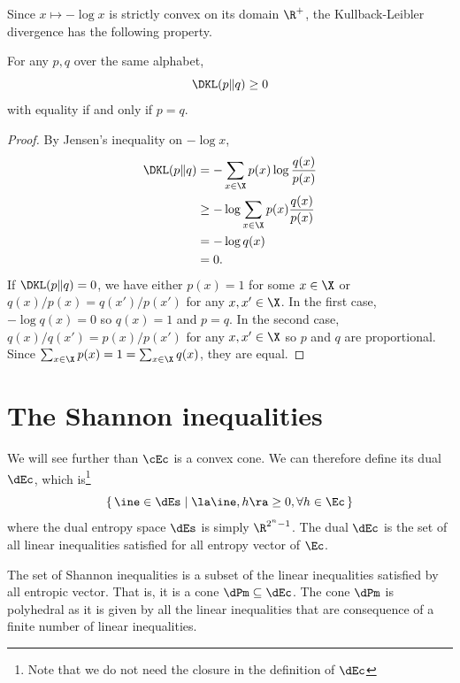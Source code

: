 \documentclass[11pt,twoside,a4paper,openright]{uclouvain-thesis}
\begin{document}
Since $x \mapsto -\log x$ is strictly convex on its domain $\R^+$,
the Kullback-Leibler divergence has the following property.
\begin{myprop}
  \label{prop:convex}
  For any \pmfs{} $p, q$ over the same alphabet,
  \[ \DKL(p \| q) \geq 0 \]
  with equality if and only if $p = q$.
  \begin{proof}
    By Jensen's inequality on $-\log x$,
    \begin{align*}
      \DKL(p \| q)
      & = -\sum_{x \in \X} p(x) \log\frac{q(x)}{p(x)}\\
      & \geq -\log \sum_{x \in \X} p(x) \frac{q(x)}{p(x)}\\
      & = -\log q(x)\\
      & = 0.
    \end{align*}
    If $\DKL(p \| q) = 0$, we have either $p(x) = 1$ for some $x \in \X$ or $q(x)/p(x) = q(x')/p(x')$ for any $x,x' \in \X$.
    In the first case, $-\log q(x) = 0$ so $q(x) = 1$ and $p = q$.
    In the second case, $q(x)/q(x') = p(x)/p(x')$ for any $x,x' \in \X$ so $p$ and $q$ are proportional.
    Since $\sum_{x \in \X} p(x) = 1 = \sum_{x \in \X} q(x)$, they are equal.
  \end{proof}
\end{myprop}

\section{The Shannon inequalities}
\label{sec:shannon}
We will see further than $\cEc$ is a convex cone.
We can therefore define its dual $\dEc$, which is\footnote{Note that we do not need the closure in the definition of $\dEc$}
\[ \{\, \ine \in \dEs \mid \la \ine, h \ra \geq 0, \forall h \in \Ec \,\} \]
where the dual entropy space $\dEs$ is simply $\R^{2^n-1}$.
The dual $\dEc$ is the set of all linear inequalities satisfied for all entropy vector of $\Ec$.

The set of Shannon inequalities is a subset of the linear inequalities satisfied by all entropic vector.
That is, it is a cone $\dPm \subseteq \dEc$.
The cone $\dPm$ is polyhedral as it is given by all the linear inequalities that are consequence of a finite number of linear inequalities.
\end{document}
